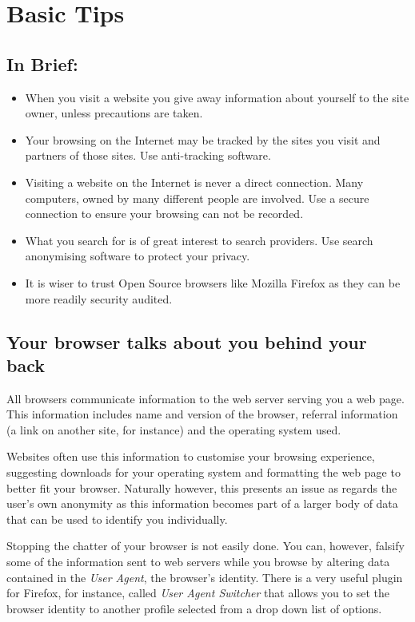 \section{Basic Tips}

\subsection{In Brief:}

\begin{itemize}
\item
  When you visit a website you give away information about yourself to
  the site owner, unless precautions are taken.
\item
  Your browsing on the Internet may be tracked by the sites you visit
  and partners of those sites. Use anti-tracking software.
\item
  Visiting a website on the Internet is never a direct connection. Many
  computers, owned by many different people are involved. Use a secure
  connection to ensure your browsing can not be recorded.
\item
  What you search for is of great interest to search providers. Use
  search anonymising software to protect your privacy.
\item
  It is wiser to trust Open Source browsers like Mozilla Firefox as they
  can be more readily security audited.
\end{itemize}
\subsection{Your browser talks about you behind your back}

All browsers communicate information to the web server serving you a web
page. This information includes name and version of the browser,
referral information (a link on another site, for instance) and the
operating system used.

Websites often use this information to customise your browsing
experience, suggesting downloads for your operating system and
formatting the web page to better fit your browser. Naturally however,
this presents an issue as regards the user's own anonymity as this
information becomes part of a larger body of data that can be used to
identify you individually.

Stopping the chatter of your browser is not easily done. You can,
however, falsify some of the information sent to web servers while you
browse by altering data contained in the \emph{User Agent}, the
browser's identity. There is a very useful plugin for Firefox, for
instance, called \emph{User Agent Switcher} that allows you to set the
browser identity to another profile selected from a drop down list of
options.

